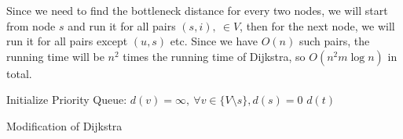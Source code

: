 \documentclass{article}
\begin{document}
Since we need to find the
bottleneck distance for every two nodes, we will start from node $s$ and run it
for all pairs $(s,i),\ \in V$, then for the next node, we will run it for all
pairs except $(u,s)$ etc. Since we have $O(n)$ such pairs, the running time
will be $n^2$ times the running time of Dijkstra, so $O(n^2m\log n)$ in total.


\begin{algorithm}
Initialize Priority Queue: $d(v)=\infty,\ \forall v\in \{V\setminus s\}, d(s)=0$\;
\Return $d(t)$\;
\caption{Modification of Dijkstra}
\label{algo:dijkstra}
\end{algorithm}
\end{document}
